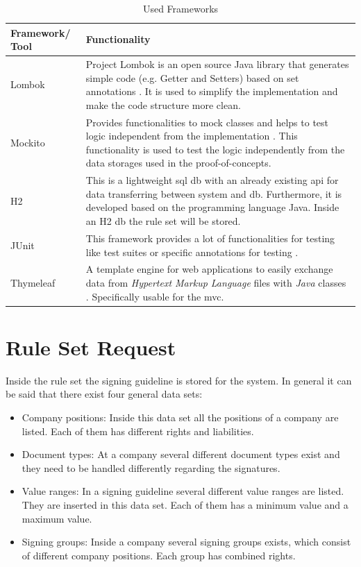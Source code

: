 \begin{table}[h!]
	\begin{tabular}{|p{2cm}|p{13cm}|} \hline
		\rowcolor{Gray}Framework/ Tool & Functionality \\ \hline
		Lombok & Project Lombok is an open source Java library that generates simple code (e.g. Getter and Setters) based on set annotations \parencite{lombok2018}. It is used to simplify the implementation and make the code structure more clean. \\ \hline
		Mockito & Provides functionalities to mock classes and helps to test logic independent from the implementation \parencite{mockito2018}. This functionality is used to test the logic independently from the data storages used in the proof-of-concepts. \\ \hline
		H2 & This is a lightweight \gls{sql} \gls{db} with an already existing \gls{api} for data transferring between system and \gls{db}. Furthermore, it is developed based on the programming language Java. \parencite{hs2018} Inside an H2 \gls{db} the rule set will be stored. \\ \hline
		JUnit & This framework provides a lot of functionalities for testing like test suites or specific annotations for testing \parencite{junit2018}. \\ \hline
		Thymeleaf& A template engine for web applications to easily exchange data from \textit{Hypertext Markup Language} files with \textit{Java} classes \parencite{thymeleaf2018}. Specifically usable for the \gls{mvc}.  \\ \hline
	\end{tabular}
	\centering
	\caption{Used Frameworks}
	\label{tab:frameworks}
\end{table}

\section{Rule Set Request}\label{sec:ruleRequest}
Inside the rule set the signing guideline is stored for the system. In general it can be said that there exist four general data sets:
\begin{itemize}
	\item Company positions: \newline
	Inside this data set all the positions of a company are listed. Each of them has different rights and liabilities.
	\item Document types: \newline
	At a company several different document types exist and they need to be handled differently regarding the signatures. 
	\item Value ranges: \newline
	In a signing guideline several different value ranges are listed. They are inserted in this data set. Each of them has a minimum value and a maximum value.
	\item Signing groups: \newline
	Inside a company several signing groups exists, which consist of different company positions. Each group has combined rights.
\end{itemize}


